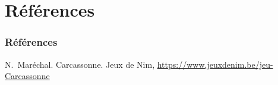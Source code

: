 \documentclass[11pt]{beamer}
\begin{document}
\section{Références}

\begin{frame}
	\frametitle{Références}
	
	\begin{thebibliography}{Biblio}
		N.~Maréchal.
		\newblock Carcassonne.
		\newblock Jeux de Nim, \url{https://www.jeuxdenim.be/jeu-Carcassonne}
	\end{thebibliography}
\end{frame}
%
\end{document}

